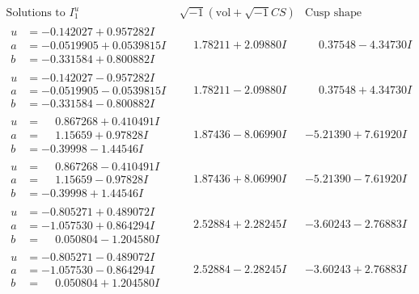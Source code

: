 \documentclass[1p]{elsarticle_modified}
\theoremstyle{definition}
\newcommand{\I}{\sqrt{-1}}
\begin{document}
$$\begin{array}{c|c|c}  
\text{Solutions to }I^u_{1}& \I (\text{vol} + \sqrt{-1}CS) & \text{Cusp shape}\\
 \hline 
\begin{aligned}
u &= -0.142027 + 0.957282 I \\
a &= -0.0519905 + 0.0539815 I \\
b &= -0.331584 + 0.800882 I\end{aligned}
 & \phantom{-}1.78211 + 2.09880 I & \phantom{-}0.37548 - 4.34730 I \\ \hline\begin{aligned}
u &= -0.142027 - 0.957282 I \\
a &= -0.0519905 - 0.0539815 I \\
b &= -0.331584 - 0.800882 I\end{aligned}
 & \phantom{-}1.78211 - 2.09880 I & \phantom{-}0.37548 + 4.34730 I \\ \hline\begin{aligned}
u &= \phantom{-}0.867268 + 0.410491 I \\
a &= \phantom{-}1.15659 + 0.97828 I \\
b &= -0.39998 - 1.44546 I\end{aligned}
 & \phantom{-}1.87436 - 8.06990 I & -5.21390 + 7.61920 I \\ \hline\begin{aligned}
u &= \phantom{-}0.867268 - 0.410491 I \\
a &= \phantom{-}1.15659 - 0.97828 I \\
b &= -0.39998 + 1.44546 I\end{aligned}
 & \phantom{-}1.87436 + 8.06990 I & -5.21390 - 7.61920 I \\ \hline\begin{aligned}
u &= -0.805271 + 0.489072 I \\
a &= -1.057530 + 0.864294 I \\
b &= \phantom{-}0.050804 - 1.204580 I\end{aligned}
 & \phantom{-}2.52884 + 2.28245 I & -3.60243 - 2.76883 I \\ \hline\begin{aligned}
u &= -0.805271 - 0.489072 I \\
a &= -1.057530 - 0.864294 I \\
b &= \phantom{-}0.050804 + 1.204580 I\end{aligned}
 & \phantom{-}2.52884 - 2.28245 I & -3.60243 + 2.76883 I \\ \hline\begin{aligned}

\end{aligned}
\end{array}$$
\end{document}
